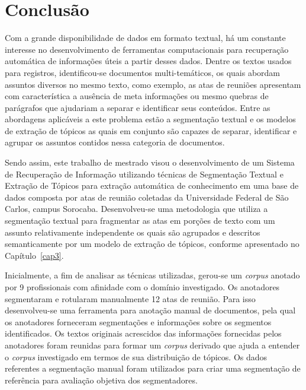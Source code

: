 \chapter{Conclusão}
\label{cap:conclusao}





Com a grande disponibilidade de dados em formato textual, há um constante interesse no desenvolvimento de ferramentas computacionais para recuperação automática de informações úteis a partir desses dados. 
Dentre os textos usados para registros, identificou-se documentos multi-temáticos, os quais abordam assuntos diversos no mesmo texto, como exemplo, as atas de reuniões apresentam com característica a ausência de meta informações ou mesmo quebras de parágrafos que ajudariam a separar e identificar seus conteúdos. 
Entre as abordagens aplicáveis a este problema estão a segmentação textual e os modelos de extração de tópicos as quais em conjunto são capazes de separar, identificar e agrupar os assuntos contidos nessa categoria de documentos.







Sendo assim, este trabalho de mestrado visou o desenvolvimento de um Sistema de Recuperação de Informação utilizando técnicas de Segmentação Textual e Extração de Tópicos para extração automática de conhecimento em uma base de dados composta por atas de reunião coletadas da Universidade Federal de São Carlos, campus Sorocaba. 
Desenvolveu-se uma metodologia que utiliza a segmentação textual para fragmentar as atas em porções de texto com um assunto relativamente independente os quais são agrupados e descritos semanticamente por um modelo de extração de tópicos, conforme apresentado no Capítulo~\ref{cap3}.

Inicialmente, a fim de analisar as técnicas utilizadas, gerou-se um \textit{corpus} anotado por 9 profissionais com afinidade com o domínio investigado. Os anotadores segmentaram e rotularam manualmente 12 atas de reunião. 
Para isso desenvolveu-se uma ferramenta para anotação manual de documentos, pela qual os anotadores forneceram segmentações e informações sobre os segmentos identificados.
Os textos originais acrescidos das informações fornecidas pelos anotadores foram reunidas para formar um \textit{corpus} derivado que ajuda a entender o \textit{corpus} investigado em termos de sua distribuição de tópicos. Os dados referentes a segmentação manual foram utilizados para criar uma segmentação de referência para avaliação objetiva dos segmentadores. 

